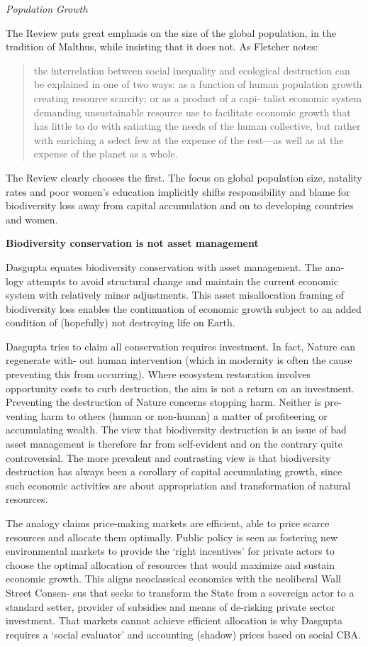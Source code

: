 \documentclass[
]{book}
\begin{document}
\emph{Population Growth}

The Review puts great emphasis on the size of the global population, in the tradition of Malthus,
while insisting that it does not. As Fletcher notes:

\begin{quote}
the interrelation between social inequality and ecological destruction can be explained in one of two
ways: as a function of human population growth creating resource scarcity; or as a product of a capi-
talist economic system demanding unsustainable resource use to facilitate economic growth that has
little to do with satiating the needs of the human collective, but rather with enriching a select few at
the expense of the rest---as well as at the expense of the planet as a whole.
\end{quote}

The Review clearly chooses the first. The focus on global population size, natality rates and poor
women's education implicitly shifts responsibility and blame for biodiversity loss away from capital
accumulation and on to developing countries and women.

\textbf{Biodiversity conservation is not asset management}

Dasgupta equates biodiversity conservation with asset management. The ana-
logy attempts to avoid structural change and maintain the current economic system with relatively
minor adjustments. This asset misallocation framing of biodiversity loss enables the continuation of
economic growth subject to an added condition of (hopefully) not destroying life on Earth.

Dasgupta tries to claim all conservation requires investment. In fact, Nature can regenerate with-
out human intervention (which in modernity is often the cause preventing this from occurring).
Where ecosystem restoration involves opportunity costs to curb destruction, the aim is not a return
on an investment. Preventing the destruction of Nature concerns stopping harm. Neither is pre-
venting harm to others (human or non-human) a matter of profiteering or accumulating wealth.
The view that biodiversity destruction is an issue of bad asset management is therefore far from
self-evident and on the contrary quite controversial. The more prevalent and contrasting view is
that biodiversity destruction has always been a corollary of capital accumulating growth, since such
economic activities are about appropriation and transformation of natural resources.

The analogy claims price-making markets are efficient, able to price scarce resources and allocate
them optimally. Public policy is seen as fostering new environmental markets to provide the `right
incentives' for private actors to choose the optimal allocation of resources that would maximize and
sustain economic growth. This aligns neoclassical economics with the neoliberal Wall Street Consen-
sus that seeks to transform the State from a sovereign actor to a standard setter, provider of subsidies
and means of de-risking private sector investment. That markets cannot achieve efficient allocation is
why Dasgupta requires a `social evaluator' and accounting (shadow) prices based on social CBA.
\end{document}
